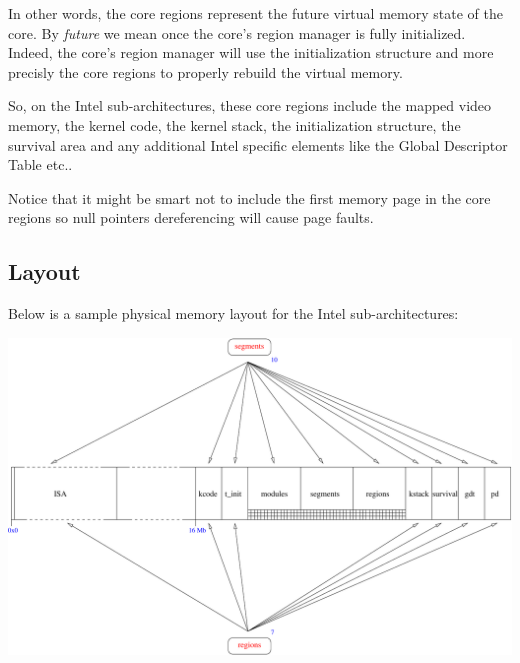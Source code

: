 In other words, the core regions represent the future virtual memory
state of the core. By \textit{future} we mean once the core's region
manager is fully initialized. Indeed, the core's region manager will
use the initialization structure and more precisly the core regions to
properly rebuild the virtual memory.

So, on the Intel sub-architectures, these core regions include the mapped
video memory, the kernel code, the kernel stack, the initialization
structure, the survival area and any additional Intel specific elements
like the Global Descriptor Table etc..

Notice that it might be smart not to include the first memory page in
the core regions so null pointers dereferencing will cause page faults.

%
%

\subsection{Layout}

Below is a sample physical memory layout for the Intel sub-architectures:

\begin{center}
  \includegraphics[scale=0.7]{figures/k1-memory-layout.pdf}
\end{center}
